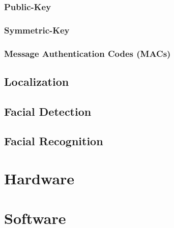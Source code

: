 \documentclass[12pt]{report}
\begin{document}
\subsubsection{Public-Key}

\subsubsection{Symmetric-Key}

\subsubsection{Message Authentication Codes (MACs)}


\subsection{Localization}

\subsection{Facial Detection}

\subsection{Facial Recognition}

\section{Hardware}

\section{Software}
\end{document}
